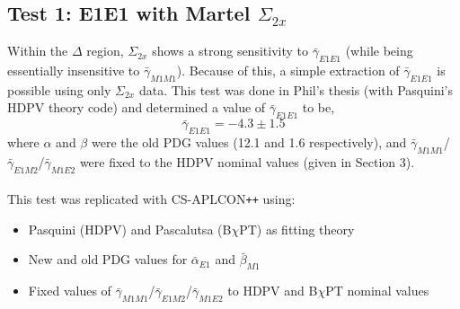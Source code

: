 \documentclass[]{article}
\begin{document}
\subsection{Test 1: E1E1 with Martel $\Sigma_{2x}$}\label{Section:PhilTest}

Within the $\Delta$ region, $\Sigma_{2x}$ shows a strong sensitivity to $\bar{\gamma}_{E1E1}$ (while being essentially insensitive to $\bar{\gamma}_{M1M1}$). Because of this, a simple extraction of $\bar{\gamma}_{E1E1}$ is possible using only $\Sigma_{2x}$ data. This test was done in Phil's thesis (with Pasquini's HDPV theory code) and determined a value of $\bar{\gamma}_{E1E1}$ to be,
%
\begin{equation}
\bar{\gamma}_{E1E1} = -4.3 \pm 1.5 
\end{equation}
%
where $\alpha$ and $\beta$ were the old PDG values (12.1 and 1.6 respectively), and $\bar{\gamma}_{M1M1}$/$\bar{\gamma}_{E1M2}$/$\bar{\gamma}_{M1E2}$ were fixed to the HDPV nominal values (given in Section 3). \\

\noindent \\This test was replicated with CS-APLCON\texttt{++} using:
\begin{itemize}
	\item Pasquini (HDPV) and Pascalutsa (B$\chi$PT) as fitting theory
	\item New and old PDG values for $\bar{\alpha}_{E1}$ and $\bar{\beta}_{M1}$
	\item Fixed values of $\bar{\gamma}_{M1M1}$/$\bar{\gamma}_{E1M2}$/$\bar{\gamma}_{M1E2}$ to HDPV and B$\chi$PT nominal values
\end{itemize}
\end{document}
